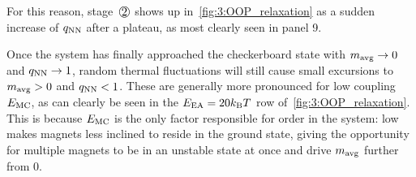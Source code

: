 For this reason, stage~$\circled{2}$ shows up in~\cref{fig:3:OOP_relaxation} as a sudden increase of $q_\mathrm{NN}$ after a plateau, as most clearly seen in panel 9. \par
Once the system has finally approached the checkerboard state with $m_\mathrm{avg} \rightarrow 0$ and $q_\mathrm{NN} \rightarrow 1$, random thermal fluctuations will still cause small excursions to $m_\mathrm{avg} > 0$ and $q_\mathrm{NN} < 1$.
These are generally more pronounced for low coupling $E_\mathrm{MC}$, as can clearly be seen in the $\EEA = 20\kBT$ row of~\cref{fig:3:OOP_relaxation}.
This is because $E_\mathrm{MC}$ is the only factor responsible for order in the system: low  makes magnets less inclined to reside in the ground state, giving the opportunity for multiple magnets to be in an unstable state at once and drive $m_\mathrm{avg}$ further from 0.


